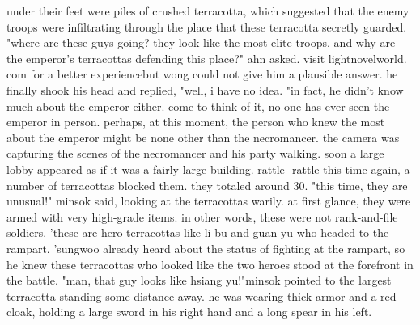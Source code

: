 under their feet were piles of crushed terracotta, which suggested that the enemy troops were infiltrating through the place that these terracotta secretly guarded.
"where are these guys going? they look like the most elite troops.
 and why are the emperor's terracottas defending this place?" ahn asked.
visit lightnovelworld.
com for a better experiencebut wong could not give him a plausible answer.
 he finally shook his head and replied, "well, i have no idea.
"in fact, he didn't know much about the emperor either.
 come to think of it, no one has ever seen the emperor in person.
perhaps, at this moment, the person who knew the most about the emperor might be none other than the necromancer.
the camera was capturing the scenes of the necromancer and his party walking.
 soon a large lobby appeared as if it was a fairly large building.
rattle- rattle-this time again, a number of terracottas blocked them.
 they totaled around 30.
"this time, they are unusual!" minsok said, looking at the terracottas warily.
at first glance, they were armed with very high-grade items.
in other words, these were not rank-and-file soldiers.
 'these are hero terracottas like li bu and guan yu who headed to the rampart.
'sungwoo already heard about the status of fighting at the rampart, so he knew these terracottas who looked like the two heroes stood at the forefront in the battle.
"man, that guy looks like hsiang yu!"minsok pointed to the largest terracotta standing some distance away.
 he was wearing thick armor and a red cloak, holding a large sword in his right hand and a long spear in his left.

